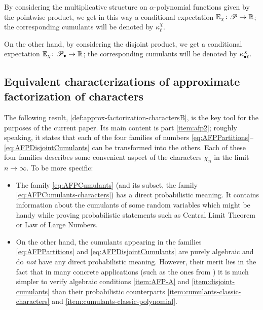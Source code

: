 \documentclass[12pt,usenames,dvipsnames,svgnames,table]{amsart}
\begin{document}
\medskip

By considering the multiplicative structure on $\alpha$-polynomial functions
given by the pointwise product, we get in this way a conditional expectation
$\mathbb{E}_\chi\colon \mathscr{P} \to \mathbb{R}$;
the corresponding cumulants will be denoted by
$\kappa_{\ell}^{\chi}$.

On the other hand, by considering the disjoint product, we get a conditional expectation
$\mathbb{E}_\chi\colon \mathscr{P}_\bullet \to \mathbb{R}$;
the corresponding cumulants will be denoted by
$\kappa_{\bullet \ell}^{\chi}$.

\subsection{Equivalent characterizations of approximate factorization of characters}

The following result, \cref{def:approx-factorization-charactersB}, 
is the key tool for the purposes of the current paper.
Its main content is part \ref{item:afp2};
roughly speaking, it states that 
each of the four families of numbers 
\eqref{eq:AFPPartitions}--\eqref{eq:AFPDisjointCumulants}
can be transformed 
into the others.
Each of these four families describes some convenient aspect of the characters $\chi_n$
in the limit $n\to\infty$.
To be more specific:
\begin{itemize}
	\item The family \eqref{eq:AFPCumulants} 
	(and its subset, the family \eqref{eq:AFPCumulants-characters})
	has a direct probabilistic meaning.
	It contains information about the cumulants of some random variables
	which might be handy while proving probabilistic statements such as
	Central Limit Theorem or Law of Large Numbers.
	
	\item On the other hand, the cumulants appearing in the families 
	\eqref{eq:AFPPartitions} and \eqref{eq:AFPDisjointCumulants} are purely algebraic 
	and do \emph{not} have any direct probabilistic meaning.
	However, their merit lies in the fact that in many concrete applications
	(such as the ones from \cite{DolegaSniady-examples-AFP})
	it is much simpler to verify algebraic conditions \ref{item:AFP-A} and 
	\ref{item:disjoint-cumulants} than their probabilistic counterparts
	\ref{item:cumulants-classic-characters} and \ref{item:cumulants-classic-polynomial}.
	
\end{itemize}
\end{document}

